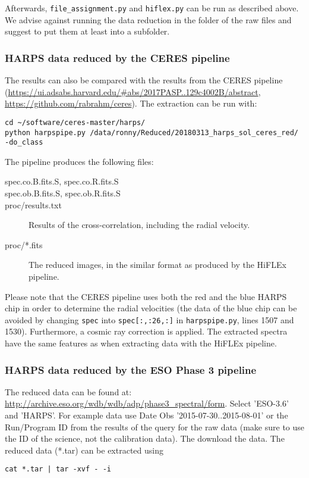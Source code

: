 \documentclass[10pt,a4paper]{article}
\begin{document}
\noindent Afterwards, \verb|file_assignment.py| and \verb|hiflex.py| can be run as described above. We advise against running the data reduction in the folder of the raw files and suggest to put them at least into a subfolder.

\subsubsection{HARPS data reduced by the CERES pipeline}
The results can also be compared with the results from the CERES pipeline (\url{https://ui.adsabs.harvard.edu/#abs/2017PASP..129c4002B/abstract}, \url{https://github.com/rabrahm/ceres}). The extraction can be run with:
\begin{lstlisting}[style=base]
cd ~/software/ceres-master/harps/
python harpspipe.py /data/ronny/Reduced/20180313_harps_sol_ceres_red/ -do_class
\end{lstlisting}

The pipeline produces the following files:
\begin{description}
  \item[spec.co.B.fits.S, spec.co.R.fits.S] 
  \item[spec.ob.B.fits.S, spec.ob.R.fits.S] 
  \item[proc/results.txt] Results of the cross-correlation, including the radial velocity.
  \item[proc/*.fits] The reduced images, in the similar format as produced by the HiFLEx pipeline.
\end{description}

Please note that the CERES pipeline uses both the red and the blue HARPS chip in order to determine the radial velocities (the data of the blue chip can be avoided by changing \verb|spec| into \verb|spec[:,:26,:]| in \verb|harpspipe.py|, lines 1507 and 1530). Furthermore, a cosmic ray correction is applied. The extracted spectra have the same features as when extracting data with the HiFLEx pipeline.


\subsubsection{HARPS data reduced by the ESO Phase 3 pipeline}
The reduced data can be found at: \url{http://archive.eso.org/wdb/wdb/adp/phase3_spectral/form}. Select 'ESO-3.6' and 'HARPS'. For example data use Date Obs '2015-07-30..2015-08-01' or the Run/Program ID from the results of the query for the raw data (make sure to use the ID of the science, not the calibration data). The download the data. The reduced data (*.tar) can be extracted using
\begin{lstlisting}[style=base]
cat *.tar | tar -xvf - -i
\end{lstlisting}
\end{document}
